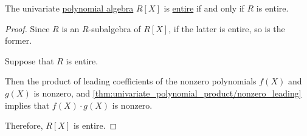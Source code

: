 \begin{corollary}\label{thm:entire_polynomial_algebra}
  The univariate \hyperref[def:polynomial_algebra]{polynomial algebra} \( R[X] \) is \hyperref[def:entire_semiring]{entire} if and only if \( R \) is entire.
\end{corollary}
\begin{proof}
  \SufficiencySubProof* Since \( R \) is an \( R \)-subalgebra of \( R[X] \), if the latter is entire, so is the former.

  \NecessitySubProof* Suppose that \( R \) is entire.

  Then the product of leading coefficients of the nonzero polynomials \( f(X) \) and \( g(X) \) is nonzero, and \cref{thm:univariate_polynomial_product/nonzero_leading} implies that \( f(X) \cdot g(X) \) is nonzero.

  Therefore, \( R[X] \) is entire.
\end{proof}


